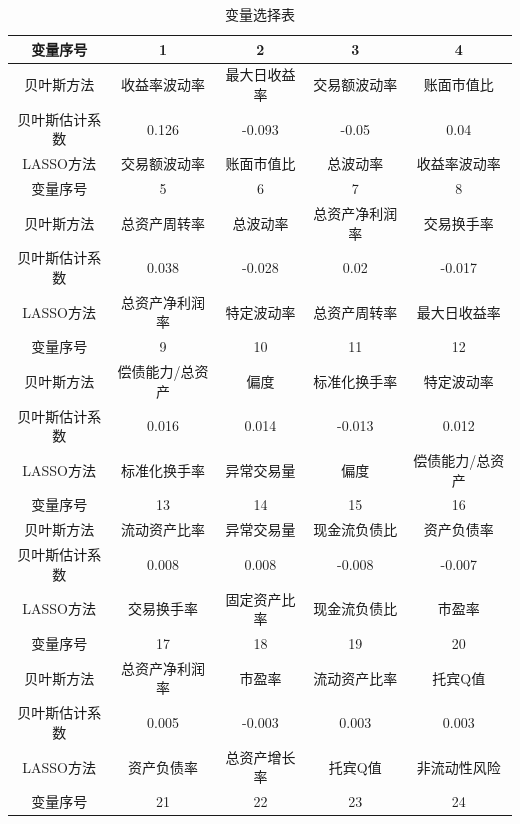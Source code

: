 \documentclass[12pt]{article} %
\begin{document}
	\begin{table}[]
		\footnotesize
		\caption{变量选择表} \label{biao1}
		\begin{tabular}{ccccc}
			\hline
			变量序号    & 1         & 2        & 3        & 4        \\ \hline
			贝叶斯方法   & 收益率波动率    & 最大日收益率   & 交易额波动率   & 账面市值比    \\
			贝叶斯估计系数 & 0.126     & -0.093   & -0.05    & 0.04     \\
			LASSO方法 & 交易额波动率    & 账面市值比    & 总波动率     & 收益率波动率   \\ \hline
			变量序号    & 5         & 6        & 7        & 8        \\ \hline
			贝叶斯方法   & 总资产周转率    & 总波动率     & 总资产净利润率  & 交易换手率    \\
			贝叶斯估计系数 & 0.038     & -0.028   & 0.02     & -0.017   \\
			LASSO方法 & 总资产净利润率   & 特定波动率    & 总资产周转率   & 最大日收益率   \\ \hline
			变量序号    & 9         & 10       & 11       & 12       \\ \hline
			贝叶斯方法   & 偿债能力/总资产  & 偏度       & 标准化换手率   & 特定波动率    \\
			贝叶斯估计系数 & 0.016     & 0.014    & -0.013   & 0.012    \\
			LASSO方法 & 标准化换手率    & 异常交易量    & 偏度       & 偿债能力/总资产 \\ \hline
			变量序号    & 13        & 14       & 15       & 16       \\ \hline
			贝叶斯方法   & 流动资产比率    & 异常交易量    & 现金流负债比   & 资产负债率    \\
			贝叶斯估计系数 & 0.008     & 0.008    & -0.008   & -0.007   \\
			LASSO方法 & 交易换手率     & 固定资产比率   & 现金流负债比   & 市盈率      \\ \hline
			变量序号    & 17        & 18       & 19       & 20       \\ \hline
			贝叶斯方法   & 总资产净利润率   & 市盈率      & 流动资产比率   & 托宾Q值     \\
			贝叶斯估计系数 & 0.005     & -0.003   & 0.003    & 0.003    \\
			LASSO方法 & 资产负债率     & 总资产增长率   & 托宾Q值     & 非流动性风险   \\ \hline
			变量序号    & 21        & 22       & 23       & 24       \\ \hline

\end{tabular}
\end{table}
\end{document}
